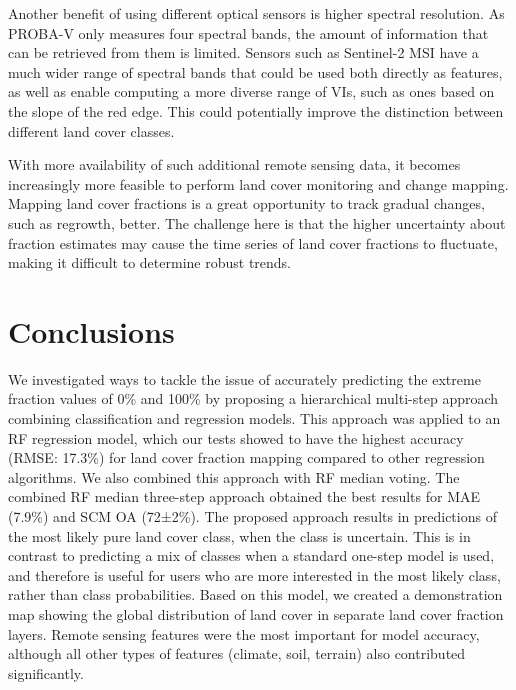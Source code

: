\documentclass[review,authoryear,3p]{elsarticle}
\begin{document}
Another benefit of using different optical sensors is higher spectral resolution.
As PROBA-V only measures four spectral bands, the amount of information that can be retrieved from them is limited.
Sensors such as Sentinel-2 \gls{MSI} have a much wider range of spectral bands that could be used both directly as features, as well as enable computing a more diverse range of \glspl{VI}, such as ones based on the slope of the red edge.
This could potentially improve the distinction between different land cover classes.

With more availability of such additional remote sensing data, it becomes increasingly more feasible to perform land cover monitoring and change mapping.
Mapping land cover fractions is a great opportunity to track gradual changes, such as regrowth, better.
The challenge here is that the higher uncertainty about fraction estimates may cause the time series of land cover fractions to fluctuate, making it difficult to determine robust trends.

\section{Conclusions}

We investigated ways to tackle the issue of accurately predicting the extreme fraction values of 0\% and 100\% by proposing a hierarchical multi-step approach combining classification and regression models.
This approach was applied to an \gls{RF} regression model, which our tests showed to have the highest accuracy (RMSE: 17.3\%) for land cover fraction mapping compared to other regression algorithms.
We also combined this approach with \gls{RF} median voting.
The combined \gls{RF} median three-step approach obtained the best results for \gls{MAE} (7.9\%) and \gls{SCM} \gls{OA} (72±2\%).
The proposed approach results in predictions of the most likely pure land cover class, when the class is uncertain.
This is in contrast to predicting a mix of classes when a standard one-step model is used, and therefore is useful for users who are more interested in the most likely class, rather than class probabilities.
Based on this model, we created a demonstration map showing the global distribution of land cover in separate land cover fraction layers.
Remote sensing features were the most important for model accuracy, although all other types of features (climate, soil, terrain) also contributed significantly.
\end{document}
